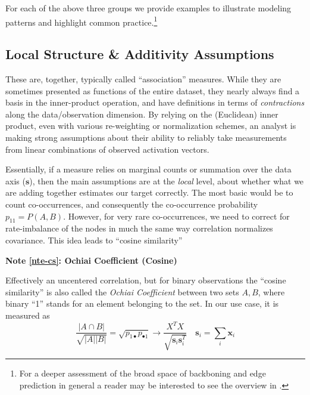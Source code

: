 \documentclass[%
	12pt,
		oneside,
		letterpaper
]{book}
\newcounter{quartocalloutnteno}
\newcommand{\quartocalloutnte}[1]{\refstepcounter{quartocalloutnteno}\label{#1}}
\begin{document}
For each of the above three groups we provide examples to illustrate modeling patterns and highlight common practice.\footnote{
  For a deeper assessment of the broad space of backboning and edge prediction in general a reader may be interested to see the overview in \textcite{atlasaspiringnetwork_Coscia2021}.}

\subsection{Local Structure \& Additivity Assumptions}\label{local-structure-additivity-assumptions}

These are, together, typically called ``association'' measures.
While they are sometimes presented as functions of the entire dataset, they nearly always find a basis in the inner-product operation, and have definitions in terms of \emph{contractions} along the data/observation dimension.
By relying on the (Euclidean) inner product, even with various re-weighting or normalization schemes, an analyst is making strong assumptions about their ability to reliably take measurements from linear combinations of observed activation vectors.

Essentially, if a measure relies on marginal counts or summation over the data axis (\(\mathbf{s}\)), then the main assumptions are at the \emph{local} level, about whether what we are adding together estimates our target correctly.
The most basic would be to count co-occurrences, and consequently the co-occurrence probability \(p_{11}=P(A,B)\).
However, for very rare co-occurrences, we need to correct for rate-imbalance of the nodes in much the same way correlation normalizes covariance.
This idea leads to ``cosine similarity''

\begin{tcolorbox}[enhanced jigsaw, toprule=.15mm, left=2mm, leftrule=.75mm, rightrule=.15mm, colframe=quarto-callout-note-color-frame, arc=.35mm, colback=white, opacityback=0, bottomrule=.15mm, breakable]

\quartocalloutnte{nte-cs} 

\vspace{-3mm}\textbf{Note \ref*{nte-cs}: Ochiai Coefficient (Cosine)}\vspace{3mm}

Effectively an uncentered correlation, but for binary observations the ``cosine similarity'' is also called the \emph{Ochiai Coefficient} between two sets \(A,B\), where binary ``1'' stands for an element belonging to the set.\autocite{Measuresecologicalassociation_Janson1981}
In our use case, it is measured as
\[
\frac{|A \cap B |}{\sqrt{|A||B|}}=\sqrt{p_{1\bullet}p_{\bullet 1}} \rightarrow  \frac{X^TX}{\sqrt{\mathbf{s}_i\mathbf{s}_i^T}}\quad \mathbf{s}_i = \sum_i \mathbf{x}_i
\]

\end{tcolorbox}
\end{document}

